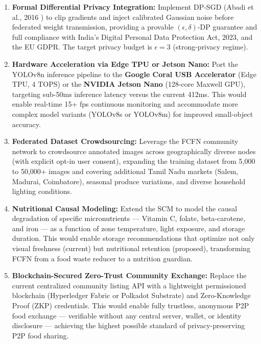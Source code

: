 \documentclass[12pt,a4paper]{report}
\begin{document}
\begin{enumerate}[leftmargin=2em, itemsep=0.3em]

\item \textbf{Formal Differential Privacy Integration:} Implement DP-SGD (Abadi et al., 2016 \cite{abadi2016}) to clip gradients and inject calibrated Gaussian noise before federated weight transmission, providing a provable $(\epsilon, \delta)$-DP guarantee and full compliance with India's Digital Personal Data Protection Act, 2023, and the EU GDPR. The target privacy budget is $\epsilon = 3$ (strong-privacy regime).

\item \textbf{Hardware Acceleration via Edge TPU or Jetson Nano:} Port the YOLOv8n inference pipeline to the \textbf{Google Coral USB Accelerator} (Edge TPU, 4 TOPS) or the \textbf{NVIDIA Jetson Nano} (128-core Maxwell GPU), targeting sub-50ms inference latency versus the current 412ms. This would enable real-time 15+ fps continuous monitoring and accommodate more complex model variants (YOLOv8s or YOLOv8m) for improved small-object accuracy.

\item \textbf{Federated Dataset Crowdsourcing:} Leverage the FCFN community network to crowdsource annotated images across geographically diverse nodes (with explicit opt-in user consent), expanding the training dataset from 5,000 to 50,000+ images and covering additional Tamil Nadu markets (Salem, Madurai, Coimbatore), seasonal produce variations, and diverse household lighting conditions.

\item \textbf{Nutritional Causal Modeling:} Extend the SCM to model the causal degradation of specific micronutrients — Vitamin C, folate, beta-carotene, and iron — as a function of zone temperature, light exposure, and storage duration. This would enable storage recommendations that optimize not only visual freshness (current) but nutritional retention (proposed), transforming FCFN from a food waste reducer to a nutrition guardian.

\item \textbf{Blockchain-Secured Zero-Trust Community Exchange:} Replace the current centralized community listing API with a lightweight permissioned blockchain (Hyperledger Fabric or Polkadot Substrate) and Zero-Knowledge Proof (ZKP) credentials. This would enable fully trustless, anonymous P2P food exchange — verifiable without any central server, wallet, or identity disclosure — achieving the highest possible standard of privacy-preserving P2P food sharing.


\end{enumerate}
\end{document}
